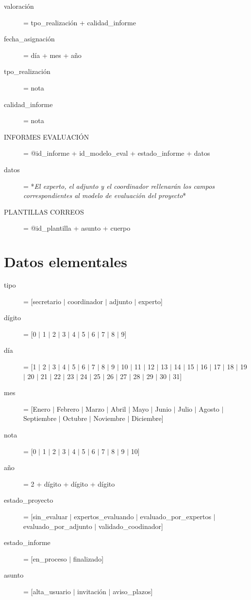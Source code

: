 \documentclass[12pt,a4paper,spanish,twoside]{book}
\begin{document}
\begin{description}
\item[valoración] = tpo\_realización + calidad\_informe

\item[fecha\_asignación] = día + mes + año

\item[tpo\_realización] = nota

\item[calidad\_informe] = nota

\item[INFORMES EVALUACIÓN] = @id\_informe + id\_modelo\_eval +
  estado\_informe + datos 

\item[datos] = *\emph{El experto, el adjunto y el coordinador rellenarán los
    campos correspondientes al modelo de evaluación del proyecto}* 

\item[PLANTILLAS CORREOS] = @id\_plantilla + asunto + cuerpo
\end{description}

\section{Datos elementales}
\begin{description}
\item[tipo] = [secretario $\mid$ coordinador $\mid$ adjunto $\mid$ experto]

\item[dígito] = [0 $\mid$ 1 $\mid$ 2 $\mid$ 3 $\mid$ 4 $\mid$ 5 $\mid$ 6
  $\mid$ 7 $\mid$ 8 $\mid$ 9] 

\item[día] = [1 $\mid$ 2 $\mid$ 3 $\mid$ 4 $\mid$ 5 $\mid$ 6 $\mid$ 7 $\mid$
  8 $\mid$ 9 $\mid$ 10 $\mid$ 11 $\mid$ 12 $\mid$ 13 $\mid$ 14 $\mid$ 15
  $\mid$ 16 $\mid$ 17 $\mid$ 18 $\mid$ 19 $\mid$ 20 $\mid$ 21 $\mid$ 22
  $\mid$ 23 $\mid$ 24 $\mid$ 25 $\mid$ 26 $\mid$ 27 $\mid$ 28 $\mid$ 29
  $\mid$ 30 $\mid$ 31] 

\item[mes] = [Enero $\mid$ Febrero $\mid$ Marzo $\mid$ Abril $\mid$ Mayo
  $\mid$ Junio $\mid$ Julio $\mid$ Agosto $\mid$ Septiembre $\mid$ Octubre
  $\mid$ Noviembre $\mid$ Diciembre] 

\item[nota] = [0 $\mid$ 1 $\mid$ 2 $\mid$ 3 $\mid$ 4 $\mid$ 5 $\mid$ 6 $\mid$
  7 $\mid$ 8 $\mid$ 9 $\mid$ 10] 

\item[año] = 2 + dígito + dígito + dígito

\item[estado\_proyecto] = [sin\_evaluar $\mid$ expertos\_evaluando $\mid$
  evaluado\_por\_expertos $\mid$ evaluado\_por\_adjunto $\mid$
  validado\_coodinador] 

\item[estado\_informe] = [en\_proceso $\mid$ finalizado]

\item[asunto] = [alta\_usuario $\mid$ invitación $\mid$ aviso\_plazos]
\end{description}
\end{document}
